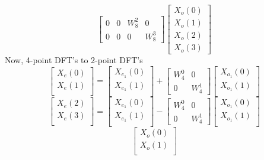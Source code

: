 \documentclass[journal,12pt,twocolumn]{IEEEtran}
\renewcommand\thesection{\arabic{section}}
\begin{document}
\begin{enumerate}[label=\thesection.\arabic*.,ref=\thesection.\theenumi]
\begin{equation}
\begin{bmatrix}
0 & 0 & W^{2}_{8} & 0\\
0 & 0 & 0 & W^{3}_{8}
\end{bmatrix}
\begin{bmatrix}
X_{o}(0) \\ 
X_{o}(1) \\ 
X_{o}(2) \\
X_{o}(3)
\end{bmatrix}
\end{equation}
Now, 4-point DFT's to 2-point DFT's
\begin{equation}
\begin{bmatrix}
X_{e}(0) \\ 
X_{e}(1)\\ 
\end{bmatrix}
=
\begin{bmatrix}
X_{e_{1}}(0) \\ 
X_{e_{1}}(1)\\ 
\end{bmatrix}
+
\begin{bmatrix}
W^{0}_{4} & 0\\
0 & W^{1}_{4}
\end{bmatrix}
\begin{bmatrix}
X_{o_{1}}(0) \\ 
X_{o_{1}}(1) \\ 
\end{bmatrix}
\end{equation}
\begin{equation}
\begin{bmatrix}
X_{e}(2) \\ 
X_{e}(3)\\ 
\end{bmatrix}
=
\begin{bmatrix}
X_{e_{1}}(0) \\ 
X_{e_{1}}(1)\\ 
\end{bmatrix}
-
\begin{bmatrix}
W^{0}_{4} & 0\\
0 & W^{1}_{4}
\end{bmatrix}
\begin{bmatrix}
X_{o_{1}}(0) \\ 
X_{o_{1}}(1) \\ 
\end{bmatrix}
\end{equation}
\begin{equation}
\begin{bmatrix}
X_{o}(0) \\ 
X_{o}(1)\\ 

\end{bmatrix}
\end{equation}
\end{enumerate}
\end{document}
